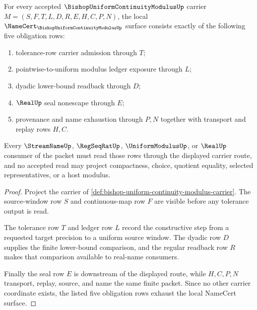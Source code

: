 \begin{theorem}
\label{thm:bishop-uniform-continuity-modulus-namecert-obligations}
For every accepted $\BishopUniformContinuityModulusUp$ carrier $M=(S,F,T,L,D,R,E,H,C,P,N)$, the local $\NameCert_{\BishopUniformContinuityModulusUp}$ surface consists exactly of the following five obligation rows:
\begin{enumerate}
\item tolerance-row carrier admission through $T$;
\item pointwise-to-uniform modulus ledger exposure through $L$;
\item dyadic lower-bound readback through $D$;
\item $\RealUp$ seal nonescape through $E$;
\item provenance and name exhaustion through $P,N$ together with transport and replay rows $H,C$.
\end{enumerate}
Every $\StreamNameUp$, $\RegSeqRatUp$, $\UniformModulusUp$, or $\RealUp$ consumer of the packet must read those rows through the displayed carrier route, and no accepted read may project compactness, choice, quotient equality, selected representatives, or a host modulus.
\end{theorem}
\begin{proof}
Project the carrier of \autoref{def:bishop-uniform-continuity-modulus-carrier}. The source-window row $S$ and continuous-map row $F$ are visible before any tolerance output is read.

The tolerance row $T$ and ledger row $L$ record the constructive step from a requested target precision to a uniform source window. The dyadic row $D$ supplies the finite lower-bound comparison, and the regular readback row $R$ makes that comparison available to real-name consumers.

Finally the seal row $E$ is downstream of the displayed route, while $H,C,P,N$ transport, replay, source, and name the same finite packet. Since no other carrier coordinate exists, the listed five obligation rows exhaust the local NameCert surface.
\end{proof}

